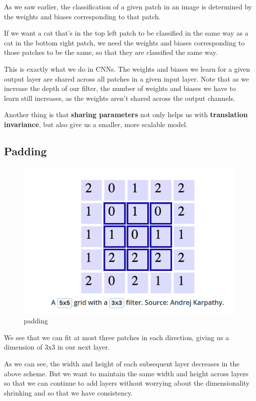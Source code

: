 \documentclass[11pt, a4paper]{article}
\begin{document}
As we saw earlier, the classification of a given patch in an image is determined by the weights and biases corresponding to that patch.

If we want a cat that’s in the top left patch to be classified in the same way as a cat in the bottom right patch, we need the weights and biases corresponding to those patches to be the same, so that they are classified the same way.

This is exactly what we do in CNNs. The weights and biases we learn for a given output layer are shared across all patches in a given input layer. Note that as we increase the depth of our filter, the number of weights and biases we have to learn still increases, as the weights aren't shared across the output channels.

Another thing is that \textbf{sharing parameters} not only helps us with \textbf{translation invariance}, but also give us a smaller, more scalable model.




\subsection{Padding}%
\label{sub:padding}

\begin{figure}[htb!]
	\centering
	\includegraphics[width=0.8\linewidth]{padding}
	\caption{padding}
	\label{fig:padding}
\end{figure}




We see that we can fit at most three patches in each direction, giving us a dimension of 3x3 in our next layer.


As we can see, the width and height of each subsequent layer decreases in the above scheme. But we want to maintain the same width and height across layers so that we can continue to add layers without worrying about the dimensionality shrinking and so that we have consistency.
\end{document}
